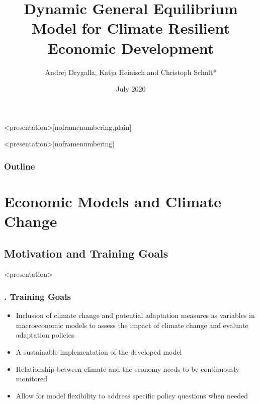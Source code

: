 \documentclass[11pt,aspectratio=169]{beamer}
\title[DGE--CRED]{Dynamic General Equilibrium Model for Climate Resilient Economic Development}
\author[Christoph Schult]{Andrej Drygalla, Katja Heinisch and Christoph Schult*} \date[July 2020]{July 2020}
\institute[IWH]{Halle Institute for Economic Research}
\begin{document}
{}

\begin{frame}<presentation>[noframenumbering,plain]
  \titlepage \\
	{\tiny} 
\end{frame}
\usebackgroundtemplate{
}
{
\begin{frame}<presentation>[noframenumbering]
	\frametitle{Outline}
		 \tableofcontents[hideallsubsections]
\end{frame}
}
\section{Economic Models and Climate Change}

\subsection{Motivation and Training Goals}
\begin{frame}<presentation>
	\frametitle{{\thesection.\thesubsection} Training Goals}
	\begin{itemize}
		\item Inclusion of climate change and potential adaptation measures as variables in macroeconomic models to assess the impact of climate change and evaluate adaptation policies  
		\item A sustainable implementation of the developed model		
		\item Relationship between climate and the economy needs to be continuously monitored
		\item Allow for model flexibility to address specific policy questions when needed
\end{itemize}
\end{frame}
\end{document}
